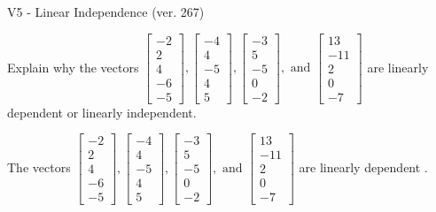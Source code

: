 \begin{exercise}
  \begin{exerciseTitle}V5 - Linear Independence (ver. 267)\end{exerciseTitle}
  \begin{exerciseStatement}
    Explain why the vectors \(\left[\begin{array}{r}
-2 \\
2 \\
4 \\
-6 \\
-5
\end{array}\right] , \left[\begin{array}{r}
-4 \\
4 \\
-5 \\
4 \\
5
\end{array}\right] , \left[\begin{array}{r}
-3 \\
5 \\
-5 \\
0 \\
-2
\end{array}\right] , \text{ and } \left[\begin{array}{r}
13 \\
-11 \\
2 \\
0 \\
-7
\end{array}\right]\) are linearly dependent or linearly independent.	


  \end{exerciseStatement}
  \begin{exerciseAnswer}
   The vectors \(\left[\begin{array}{r}
-2 \\
2 \\
4 \\
-6 \\
-5
\end{array}\right] , \left[\begin{array}{r}
-4 \\
4 \\
-5 \\
4 \\
5
\end{array}\right] , \left[\begin{array}{r}
-3 \\
5 \\
-5 \\
0 \\
-2
\end{array}\right] , \text{ and } \left[\begin{array}{r}
13 \\
-11 \\
2 \\
0 \\
-7
\end{array}\right]\) are 
  	 linearly dependent  .
  


  \end{exerciseAnswer}
\end{exercise}